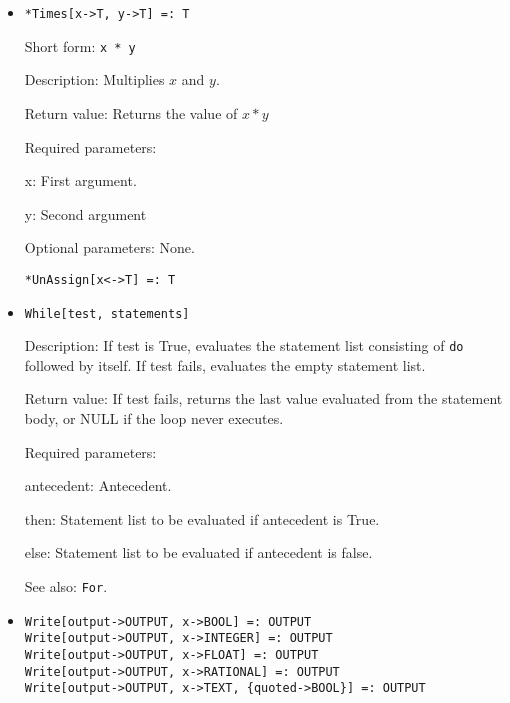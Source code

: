 \begin{itemize}
\item 
\protect \large \begin{verbatim}
*Times[x->T, y->T] =: T
\end{verbatim} \normalsize
  
\bd
\item
[Short form:] \verb+x * y+
\item
[Description:] Multiplies $x$ and $y$.
\item
[Return value:] Returns the value of $x * y$  
\item
[Required parameters:]\hfil\null
\bd
\item
[x:] First argument.  
\item
[y:] Second argument
\ed
\item
[Optional parameters:] None.
\ed


\protect \large \begin{verbatim}
*UnAssign[x<->T] =: T
\end{verbatim}\normalsize




\item 
\protect \large \begin{verbatim}
While[test, statements]
\end{verbatim} \normalsize
  
\bd
\item
[Description:] If test is True, evaluates the statement list consisting of
\verb+do+ followed by itself.  If test fails, evaluates the empty
statement list.
\item
[Return value:] If test fails, returns the last value evaluated from the
statement body, or NULL if the loop never executes.

\item
[Required parameters:]\hfil\null
\bd
\item
[antecedent:] Antecedent.  
\item
[then:] Statement list to be evaluated if antecedent is True. 
\item
[else:] Statement list to be evaluated if antecedent is false. 
\ed
\item
[See also:] \verb+For+.
\ed

\item
\protect \large \begin{verbatim}
Write[output->OUTPUT, x->BOOL] =: OUTPUT 
Write[output->OUTPUT, x->INTEGER] =: OUTPUT
Write[output->OUTPUT, x->FLOAT] =: OUTPUT
Write[output->OUTPUT, x->RATIONAL] =: OUTPUT
Write[output->OUTPUT, x->TEXT, {quoted->BOOL}] =: OUTPUT
\end{verbatim}\normalsize



\end{itemize}
